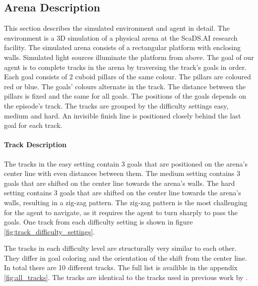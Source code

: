 \subsection{Arena Description}


This section describes the simulated environment and agent in detail. The environment is a 3D simulation of a physical arena at the ScaDS.AI research facility. The simulated arena consists of a rectangular platform with enclosing walls. Simulated light sources illuminate the platform from above.
The goal of our agent is to complete tracks in the arena by traversing the track's goals in order. Each goal consists of 2 cuboid pillars of the same colour. The pillars are coloured red or blue. The goals' colours alternate in the track. The distance between the pillars is fixed and the same for all goals. The positions of the goals depends on the episode's track. The tracks are grouped by the difficulty settings easy, medium and hard. An invisible finish line is positioned closely behind the last goal for each track.


\paragraph{Track Description}
The tracks in the easy setting contain 3 goals that are positioned on the arena's center line with even distances between them. The medium setting contains 3 goals that are shifted on the center line towards the arena's walls. The hard setting contains 3 goals that are shifted on the center line towards the arena's walls, resulting in a zig-zag pattern. The zig-zag pattern is the most challenging for the agent to navigate, as it requires the agent to turn sharply to pass the goals. One track from each difficulty setting is shown in figure \ref{fig:track_difficulty_settings}. 

The tracks in each difficulty level are structurally very similar to each other. They differ in goal coloring and the orientation of the shift from the center line. In total there are 10 different tracks. The full list is availible in the appendix \ref{fig:all_tracks}. The tracks are identical to the tracks used in previous work by \textcite{maximilian}.

